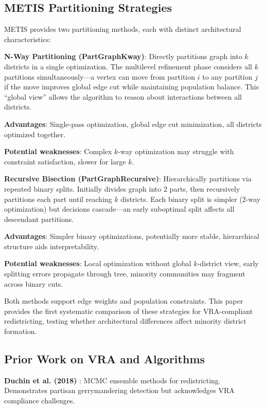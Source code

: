 \subsection{METIS Partitioning Strategies}

METIS provides two partitioning methods, each with distinct architectural characteristics:

\textbf{N-Way Partitioning (PartGraphKway)}: Directly partitions graph into $k$ districts in a single optimization. The multilevel refinement phase considers all $k$ partitions simultaneously—a vertex can move from partition $i$ to any partition $j$ if the move improves global edge cut while maintaining population balance. This ``global view'' allows the algorithm to reason about interactions between all districts.

\textbf{Advantages}: Single-pass optimization, global edge cut minimization, all districts optimized together.

\textbf{Potential weaknesses}: Complex $k$-way optimization may struggle with constraint satisfaction, slower for large $k$.

\textbf{Recursive Bisection (PartGraphRecursive)}: Hierarchically partitions via repeated binary splits. Initially divides graph into 2 parts, then recursively partitions each part until reaching $k$ districts. Each binary split is simpler (2-way optimization) but decisions cascade—an early suboptimal split affects all descendant partitions.

\textbf{Advantages}: Simpler binary optimizations, potentially more stable, hierarchical structure aids interpretability.

\textbf{Potential weaknesses}: Local optimization without global $k$-district view, early splitting errors propagate through tree, minority communities may fragment across binary cuts.

Both methods support edge weights and population constraints. This paper provides the first systematic comparison of these strategies for VRA-compliant redistricting, testing whether architectural differences affect minority district formation.

\subsection{Prior Work on VRA and Algorithms}

\textbf{Duchin et al. (2018)} \citep{duchin2018}: MCMC ensemble methods for redistricting. Demonstrates partisan gerrymandering detection but acknowledges VRA compliance challenges.

